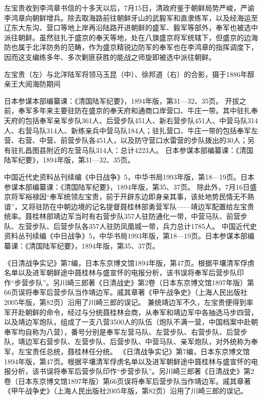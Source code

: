 \documentclass[12pt,UTF8]{ctexbook}
\begin{document}
左宝贵收到李鸿章书信的十多天以后，7月15日，清政府鉴于朝鲜局势严峻，严谕李鸿章向朝鲜增兵。除去取海路前往朝鲜牙山的武毅军和直隶练军，以及经海运至辽东大东沟、营口等地上岸再沿陆路开进朝鲜的盛军、毅军等部外，奉军也被选中派往朝鲜。虽然驻扎于盛京的奉天等地，处在八旗盛京将军统辖下，但盛京的边海防也属于北洋防务的范畴，作为盛京精锐边防军的奉军也在李鸿章的指挥调度下，因而这支编练多年、多次剿匪获胜的能战之师旋即被选中派往朝鲜。


左宝贵（左）与北洋陆军将领马玉昆（中）、徐邦道（右）的合影，摄于1886年醇亲王大阅海防期间

日本参谋本部编纂课：《清国陆军纪要》，1894年版，第31—32、35页。
开拔之前，奉军多年来主要驻防在盛京的奉天府和通商口岸营口、牛庄一带。其中驻扎奉天府的包括奉军亲军步队361人、后营步队451人、新右营步队451人、中营马队314人、右营马队314人、新练亲兵中营马队184人；驻扎营口、牛庄一带的包括奉军左营、右营、中营、前营步队各451人，以及防守营口水雷营的步队拨出的30人；另有驻扎昌图县附近的左营马队314人：总计4223人。 日本参谋本部编纂课：《清国陆军纪要》，1894年版，第31—32、35页。

中国近代史资料丛刊续编《中日战争》5，中华书局1993年版，第18—19页。日本参谋本部编纂课：《清国陆军纪要》，1894年版，第35、37页。
除此外，7月16日盛京将军裕禄因“奉军统领左宝贵，前于开辟东边即身亲其事，该处地势民情无不熟谙”，又将驻防在中朝边境的记名提督聂桂林部勇营军队——靖边军配置给左宝贵统率。聂桂林部靖边军当时有右营步队357人驻防通化一带，中营马队、前营步队、左营步队、后营步队各357人驻防凤凰城一带，兵力总计1785人。 中国近代史资料丛刊续编《中日战争》5，中华书局1993年版，第18—19页。日本参谋本部编纂课：《清国陆军纪要》，1894年版，第35、37页。

《日清战争实记》第7编，日本东京博文馆1894年版，第47页。根据平壤清军俘虏名单以及进军朝鲜途中聂桂林与盛宣怀的电报分析，该书误将奉军后营步队印作“步营步队”。另川崎三郎著《日清战史》第2卷（日本东京博文馆1897年版）第66页误将奉军后营步队当作靖边军。戚其章著《甲午战争史》（上海人民出版社2005年版，第82页）沿用了川崎三郎的误记。
兼统靖边军不久，左宝贵便得到率军开赴朝鲜的命令，经过与分统聂桂林会商，从奉军和靖边军中各抽选马步四营，以及靖边军炮队，组成了一支八营3500人的队伍（炮队不满一营，中国档案中赴朝奉军均自称为八营），番号分别是奉军左营马队、左营步队、右营步队、后营步队，靖边军右营步队、左营步队、后营步队、中营马队、亲军炮队，对外统称为奉军，左宝贵任总统，聂桂林任分统。 《日清战争实记》第7编，日本东京博文馆1894年版，第47页。根据平壤清军俘虏名单以及进军朝鲜途中聂桂林与盛宣怀的电报分析，该书误将奉军后营步队印作“步营步队”。另川崎三郎著《日清战史》第2卷（日本东京博文馆1897年版）第66页误将奉军后营步队当作靖边军。戚其章著《甲午战争史》（上海人民出版社2005年版，第82页）沿用了川崎三郎的误记。
\end{document}
